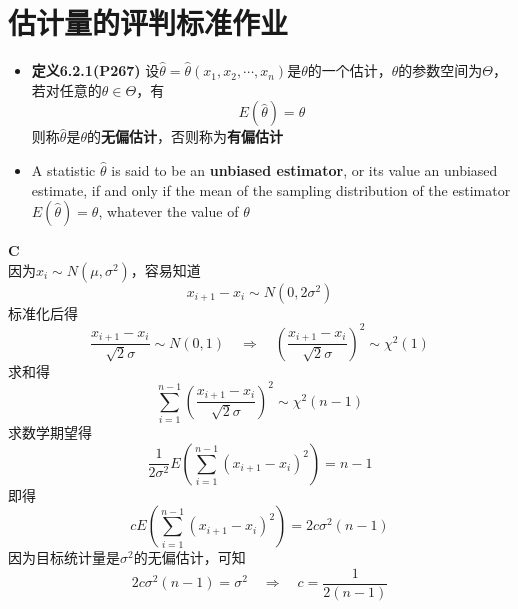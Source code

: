 \documentclass[a4paper]{ctexart}    %
\begin{document}
	\section{估计量的评判标准作业} 
	\begin{tcolorbox}
		[
		colframe=blue!25,
		colback=blue!10,
		coltitle=blue!20!black,  
		fonttitle=\bfseries,
		adjusted title=Formula Or Theorem:
		]
		\begin{itemize}
			\item \textbf{定义6.2.1(P267)} 设$ \hat{\theta} = \hat{\theta}(x_1, x_2, \cdots, x_n) $是$ \theta $的一个估计，$ \theta $的参数空间为$ \Theta $，若对任意的$ \theta \in \Theta $，有
			\begin{equation*}
				E(\hat{\theta}) = \theta
			\end{equation*}
			则称$ \hat{\theta} $是$ \theta $的\textbf{无偏估计}，否则称为\textbf{有偏估计}
			\item A statistic $ \hat{\theta} $ is said to be an \textbf{unbiased estimator}, or its value an unbiased estimate, if and only if the mean of the sampling distribution of the estimator $ E(\hat{\theta}) = \theta $, whatever the value of $ \theta $
		\end{itemize}
	\end{tcolorbox}
	 \quad \textbf{C} \\
	因为$ x_i \sim N(\mu, \sigma^2) $，容易知道
	\begin{equation*}
		x_{i+1} - x_{i} \sim N(0, 2\sigma^2)
	\end{equation*}
	标准化后得
	\begin{equation*}
		\frac{x_{i+1} - x_{i}}{\sqrt{2} \sigma} \sim N(0, 1) \quad \Rightarrow \quad \left(\frac{x_{i+1} - x_{i}}{\sqrt{2} \sigma}\right)^2 \sim \chi^2(1)
	\end{equation*}
	求和得
	\begin{equation*}
		\sum\limits_{i=1}^{n-1} \left(\frac{x_{i+1} - x_{i}}{\sqrt{2} \sigma}\right)^2 \sim \chi^2(n-1)
	\end{equation*}
	求数学期望得
	\begin{equation*}
		\frac{1}{2\sigma^2} E \left(\sum\limits_{i=1}^{n-1} \left(x_{i+1} - x_{i}\right)^2\right) = n - 1
	\end{equation*}
	即得
	\begin{equation*}
		cE \left(\sum\limits_{i=1}^{n-1} \left(x_{i+1} - x_{i}\right)^2\right) = 2c\sigma^2(n-1) 
	\end{equation*}
	因为目标统计量是$ \sigma^2 $的无偏估计，可知
	\begin{equation*}
		2c\sigma^2(n-1) = \sigma^2 \quad \Rightarrow \quad c = \frac{1}{2(n-1)}
	\end{equation*}
\end{document}
